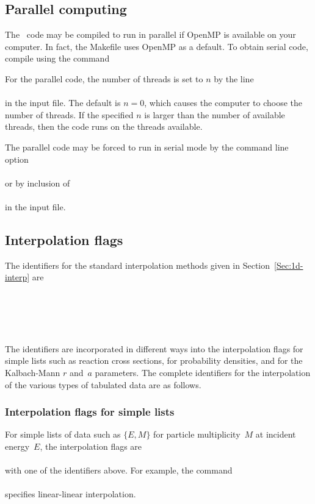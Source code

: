 \subsection{Parallel computing}
The \gettransfer\ code may be compiled to run in parallel if
\textsf{OpenMP} is available on your computer.  In fact, the
\textsf{Makefile} uses \textsf{OpenMP} as a default.  To obtain 
serial code, compile using the command\\

For the parallel code, the number of threads is set to $n$ by the
line\\
  \\
in the input file.  The default is $n = 0$, which causes the computer
to choose the number of threads.  If the specified $n$ is larger than
the number of available threads, then the code runs on the threads
available.

The parallel code may be forced to run in serial mode by
the command line  option\\
  {}\\
or by inclusion of\\
 \\
in the input file.

 \subsection{Interpolation flags} \label{interp-flags}
The identifiers for the standard interpolation methods
 given in Section~\ref{Sec:1d-interp} are\\
    \\
   \\
   \\
   \\
   \\
The identifiers are incorporated in different ways into the interpolation
flags for simple lists such as reaction cross sections, for probability densities,
and for the Kalbach-Mann $r$ and~$a$ parameters.  The complete
identifiers for the interpolation of the various types of tabulated data are as follows.

\subsubsection{Interpolation flags for simple lists}\label{interp-flags-list}
 For simple lists of data such as $\{E, M\}$ for particle multiplicity~$M$ at
 incident energy~$E$, the interpolation flags are\\
   \\
with one of the identifiers above.  For example, the command\\
   \\
specifies linear-linear interpolation.

